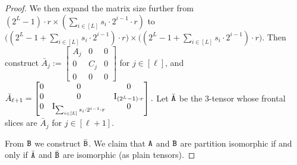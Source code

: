 \begin{proof}
We then expand the matrix size further from $(2^L-1)\cdot r \times (\sum_{i\in[L]}s_i\cdot 2^{i-1}\cdot r)$ to $\big((2^L-1+\sum_{i\in[L]}s_i\cdot 2^{i-1})\cdot r\big)\times \big((2^L-1+\sum_{i\in[L]}s_i\cdot 2^{i-1})\cdot r\big)$. Then construct 
$\bar A_j:=\begin{bmatrix}
	A_j & 0 & 0 \\
	0 & C_j & 0 \\
	0 & 0 & 0
\end{bmatrix}$ for $j\in[\ell]$, and 
$\bar A_{\ell+1}=\begin{bmatrix}
	0 & 0 & 0 \\
	0 & 0 & \mathrm{I}_{(2^L-1)\cdot r} \\
	0 & \mathrm{I}_{\sum_{i\in[L]}s_i\cdot 2^{i-1}\cdot r} & 0
\end{bmatrix}.$
Let $\bar{\mathtt{A}}$ be the 3-tensor whose frontal slices are $\bar A_j$ for $j\in[\ell+1]$.

From $\mathtt{B}$ we construct $\bar{\mathtt{B}}$. We claim that $\mathtt{A}$ and $\mathtt{B}$ are partition isomorphic if and only if $\bar{\mathtt{A}}$ and $\bar{\mathtt{B}}$ are isomorphic (as plain tensors). 


\end{proof}
